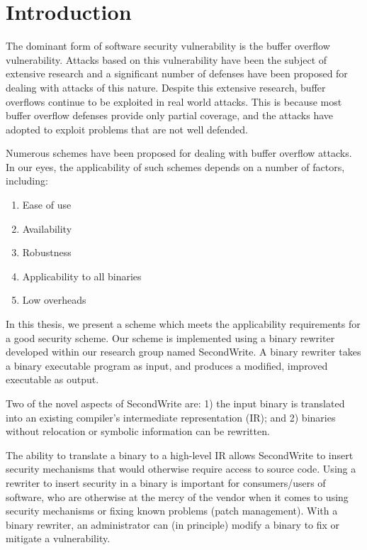 
\renewcommand{\thechapter}{1}

\chapter{Introduction}

The dominant form of software security vulnerability is the buffer overflow vulnerability. Attacks
based on this vulnerability have been the subject of extensive research and a significant number of
defenses have been proposed for dealing with attacks of this nature. Despite this extensive
research, buffer overflows continue to be exploited in real world attacks. This is because most
buffer overflow defenses provide only partial coverage, and the attacks have adopted to exploit
problems that are not well defended.

Numerous schemes have been proposed for dealing with buffer overflow attacks. In our eyes, the
applicability of such schemes depends on a number of factors, including:

\begin{enumerate}
 \item Ease of use
 \item Availability
 \item Robustness
 \item Applicability to all binaries
 \item Low overheads
\end{enumerate}

In this thesis, we present a scheme which meets the applicability requirements for a good security
scheme. Our scheme is implemented using a binary rewriter developed within our research group named
SecondWrite. A binary rewriter takes a binary executable program as input, and produces a modified,
improved executable as output. 

Two of the novel aspects of SecondWrite are: 1) the input binary is translated into an existing
compiler's intermediate representation (IR); and 2) binaries without relocation or symbolic
information can be rewritten. 

The ability to translate a binary to a high-level IR allows SecondWrite to insert security
mechanisms that would otherwise require access to source code. Using a rewriter to insert security in a binary is important for
consumers/users of software, who are otherwise at the mercy of the vendor when it comes to using
security mechanisms or fixing known problems (patch management). With a binary rewriter, an
administrator can (in principle) modify a binary to fix or mitigate a vulnerability. 

